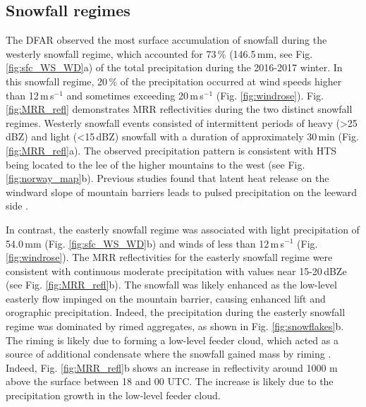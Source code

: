 \documentclass{ametsocV5}
\begin{document}
	\subsection{Snowfall regimes}\label{sec:res:snowfall_regimes}
		The DFAR observed the most surface accumulation of snowfall during the westerly snowfall regime, which accounted for 73\,\% (146.5\,mm, see Fig. \ref{fig:sfc_WS_WD}a) of the total precipitation during the 2016-2017 winter. In this snowfall regime, 20\,\% of the precipitation occurred at wind speeds higher than 12\,m\,s$^{-1}$ and sometimes exceeding 20\,m\,s$^{-1}$ (Fig. \ref{fig:windrose}). Fig. \ref{fig:MRR_refl} demonstrates MRR reflectivities during the two distinct snowfall regimes. Westerly snowfall events consisted of intermittent periods of heavy (\textgreater 25\,dBZ) and light (\textless 15\,dBZ) snowfall with a duration of approximately 30\,min (Fig. \ref{fig:MRR_refl}a). The observed precipitation pattern is consistent with HTS being located to the lee of the higher mountains to the west (see Fig. \ref{fig:norway_map}b). Previous studies found that latent heat release on the windward slope of mountain barriers leads to pulsed precipitation on the leeward side \citep{sinclair_factors_1997,kaplan_role_2009}. 

		In contrast, the easterly snowfall regime was associated with light precipitation of 54.0\,mm (Fig. \ref{fig:sfc_WS_WD}b) and  winds of less than  12\,m\,s$^{-1}$ (Fig. \ref{fig:windrose}). The MRR reflectivities for the easterly snowfall regime were consistent with continuous moderate precipitation with values near 15-20\,dBZe (see Fig. \ref{fig:MRR_refl}b). The snowfall was likely enhanced as the low-level easterly flow impinged on the mountain barrier, causing enhanced lift and orographic precipitation. Indeed, the precipitation during the easterly snowfall regime was dominated by rimed aggregates, as shown in Fig. \ref{fig:snowflakes}b. The riming is likely due to forming a low-level feeder cloud, which acted as a source of additional condensate where the snowfall gained mass by riming \citep{borys_mountaintop_2003,lowenthal_isotopic_2016}. Indeed, Fig. \ref{fig:MRR_refl}b shows an increase in reflectivity around 1000 m above the surface between 18 and 00 UTC. The increase is likely due to the precipitation growth in the low-level feeder cloud.
\end{document}
